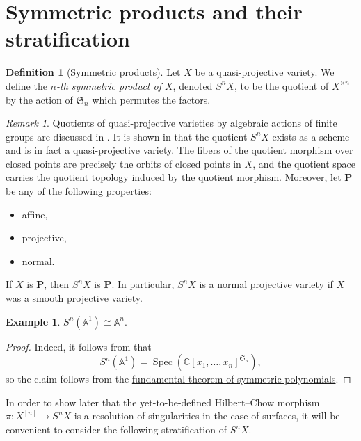 \documentclass[12pt,a4paper]{amsart}
\theoremstyle{plain}
\theoremstyle{definition}
\newtheorem{defn}[thm]{Definition}
\newtheorem{exmp}[thm]{Example}
\theoremstyle{remark}
\newtheorem{rem}[thm]{Remark}
\begin{document}
\section{Symmetric products and their stratification}

\begin{defn}[Symmetric products]
  Let $X$ be a quasi-projective variety.
  We define the \textit{$n$-th symmetric product of $X$}, denoted $S^{n}X$, to be the quotient of $X^{\times n}$ by the action of $\mathfrak{S}_{n}$ which permutes the factors.
\end{defn}

\begin{rem}
  Quotients of quasi-projective varieties by algebraic actions of finite groups are discussed in .
  It is shown in  that the quotient $S^{n}X$ exists as a scheme and is in fact a quasi-projective variety.
  The fibers of the quotient morphism over closed points are precisely the orbits of closed points in $X$, and the quotient space carries the quotient topology induced by the quotient morphism.
  Moreover, let $\mathbf{P}$ be any of the following properties:
  \begin{itemize}
    \item affine,
    \item projective,
    \item normal.
  \end{itemize}
  If $X$ is $\mathbf{P}$, then $S^{n}X$ is $\mathbf{P}$.
  In particular, $S^{n}X$ is a normal projective variety if $X$ was a smooth projective variety.
\end{rem}

\begin{exmp}\label{exmp:affineline}
  $S^{n}(\mathbb{A}^{1}) \cong \mathbb{A}^{n}$.
  
  \begin{proof}
    Indeed, it follows from  that
    \[ S^{n}(\mathbb{A}^{1}) = \operatorname{Spec}\left(\mathbb{C}[x_{1}, \ldots, x_{n}]^{\mathfrak{S}_{n}}\right), \]
    so the claim follows from the \href{https://en.wikipedia.org/wiki/Elementary_symmetric_polynomial#Fundamental_theorem_of_symmetric_polynomials}{fundamental theorem of symmetric polynomials}.
  \end{proof}
\end{exmp}

In order to show later that the yet-to-be-defined Hilbert--Chow morphism $\pi \colon X^{[n]} \to S^{n}X$ is a resolution of singularities in the case of surfaces, it will be convenient to consider the following stratification of $S^{n}X$.
\end{document}

